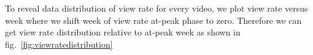 \documentclass[10pt,final,journal,a4paper]{IEEEtran}
\begin{document}
To reveal data distribution of view rate for every video, we plot view rate versus week where we shift week of view rate at-peak phase to zero. 
Therefore we can get view rate distribution relative to at-peak week as shown in fig.~\ref{fig:viewratedistribution}







\end{document}
